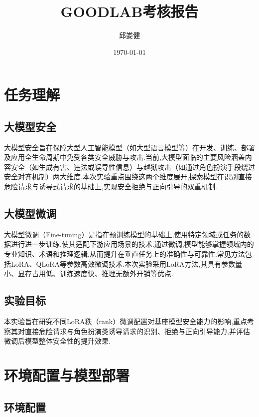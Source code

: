\documentclass[12pt]{ctexart}
\title{GOODLAB考核报告}
\author{邱娄健}
\date{\today}
\begin{document}
\maketitle


\setcounter{page}{1}
\tableofcontents
\setcounter{page}{1}


\section{任务理解}

\subsection{大模型安全}
大模型安全旨在保障大型人工智能模型（如大型语言模型等）在开发、训练、部署及应用全生命周期中免受各类安全威胁与攻击.当前,大模型面临的主要风险涵盖内容安全（如生成有害、违法或误导性信息）与越狱攻击（如通过角色扮演手段绕过安全对齐机制）两大维度.本次实验重点围绕这两个维度展开,探索模型在识别直接危险请求与诱导式请求的基础上,实现安全拒绝与正向引导的双重机制.

\subsection{大模型微调}
大模型微调（Fine-tuning）是指在预训练模型的基础上,使用特定领域或任务的数据进行进一步训练,使其适配下游应用场景的技术.通过微调,模型能够掌握领域内的专业知识、术语和推理逻辑,从而提升在垂直任务上的准确性与可靠性.常见方法包括LoRA、QLoRA等参数高效微调技术.本次实验采用LoRA方法,其具有参数量小、显存占用低、训练速度快、推理无额外开销等优点.

\subsection{实验目标}
本实验旨在研究不同LoRA秩（rank）微调配置对基座模型安全能力的影响,重点考察其对直接危险请求与角色扮演类诱导请求的识别、拒绝与正向引导能力,并评估微调后模型整体安全性的提升效果.


\section{环境配置与模型部署}

\subsection{环境配置}
\end{document}
